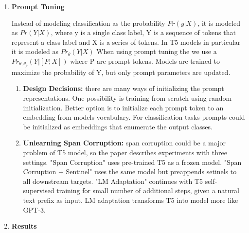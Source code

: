 \begin{enumerate}
    \item \textbf{Prompt Tuning}
    
    Instead of modeling classification as the probability $Pr(y|X)$, it is modeled as $Pr(Y|X)$, where y is a single class label, Y is a sequence of tokens that represent a class label and X is a series of tokens. In T5 models in particular it is modeled as $Pr_\theta(Y|X)$
    When using prompt tuning the we use a $Pr_{\theta;\theta_p}(Y|[P;X])$ where P are prompt tokens. Models are trained to maximize the probability of Y, but only prompt parameters are updated.
    \begin{enumerate}
        \item \textbf{Design Decisions:} there are many ways of initializing the prompt representations. One possibility is training from scratch using random initialization. Better option is to initialize each prompt token to an embedding from models vocabulary. For classification tasks prompts could be initialized as embeddings that enumerate the output classes.
        \item \textbf{Unlearning Span Corruption:} span corruption could be a major problem of T5 model, so the paper describes experiments with three settings. "Span Corruption" uses pre-trained T5 as a frozen model. "Span Corruption + Sentinel" uses the same model but preappends setinels to all downstream targets. "LM Adaptation" continues with T5 self-supervised training for small number of additional steps, given a natural text prefix as input. LM adaptation transforms T5 into model more like GPT-3.
    \end{enumerate}
    \item  \textbf{Results}
    

\end{enumerate}
